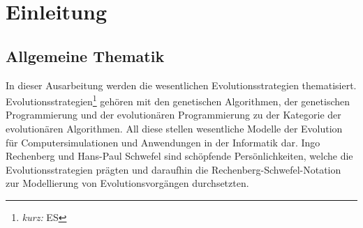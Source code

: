 
\section{Einleitung}

\subsection{Allgemeine Thematik}

In dieser Ausarbeitung werden die wesentlichen Evolutionsstrategien thematisiert.
Evolutionsstrategien\footnote{\textit{kurz:} ES} gehören mit den genetischen Algorithmen, der genetischen Programmierung und der evolutionären Programmierung zu der Kategorie der evolutionären Algorithmen. All diese stellen wesentliche Modelle der Evolution für Computersimulationen und Anwendungen in der Informatik dar.
Ingo Rechenberg und Hans-Paul Schwefel sind schöpfende Persönlichkeiten, welche die Evolutionsstrategien prägten und daraufhin die Rechenberg-Schwefel-Notation zur Modellierung von Evolutionsvorgängen durchsetzten.

